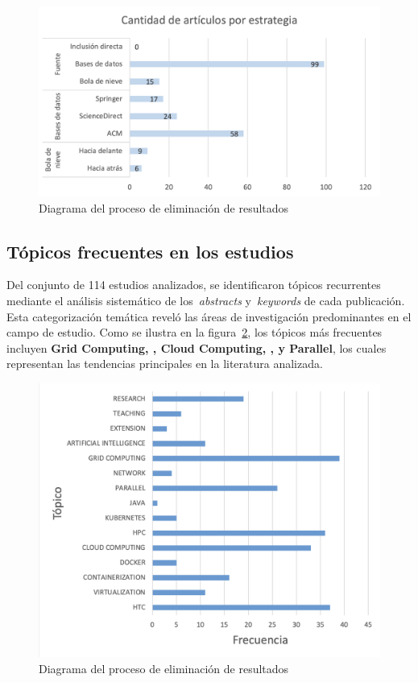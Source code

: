 \begin{figure}[H]
	\centering
	\includegraphics[scale=0.3] {tablas-images/sms/plot-estrategia_vs_articulos.png}
	\caption{Diagrama del proceso de eliminación de resultados}\label{fig:plot-estrategia_vs_articulos}
\end{figure}

\subsection{Tópicos frecuentes en los estudios}
\noindent

Del conjunto de 114 estudios analizados, se identificaron tópicos recurrentes mediante el análisis sistemático de los~\textit{abstracts} y~\textit{keywords} de cada publicación. Esta categorización temática reveló las áreas de investigación predominantes en el campo de estudio. Como se ilustra en la figura~\ref{fig:plot-topicos}, los tópicos más frecuentes incluyen \textbf{Grid Computing, \HPC, Cloud Computing, \HTC, y Parallel}, los cuales representan las tendencias principales en la literatura analizada.

\begin{figure}[H]
	\centering
	\includegraphics[scale=0.3] {tablas-images/sms/plot-topicos.png}
	\caption{Diagrama del proceso de eliminación de resultados}\label{fig:plot-topicos}
\end{figure}


